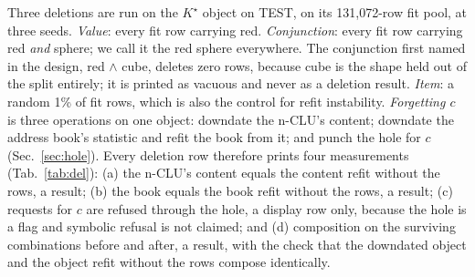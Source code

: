 \documentclass{article} %
\newcommand{\Kstar}{\ensuremath{K^{\star}}}
\begin{document}
Three deletions are run on the $\Kstar$ object on TEST, on its 131,072-row fit pool, at three %
seeds. \emph{Value}: every fit row carrying red. \emph{Conjunction}: every fit row carrying red
\emph{and} sphere; we call it the red sphere everywhere. The conjunction first named in the design,
red $\wedge$ cube, deletes zero rows, because cube is the shape held out of the split entirely; it is
printed as vacuous and never as a deletion result. \emph{Item}: a random 1\% of fit rows, which is
also the control for refit instability. \emph{Forgetting $c$} is three operations on one object:
downdate the n-CLU's content; downdate the address book's statistic and refit the book from it; and punch the
hole for $c$ (Sec.~\ref{sec:hole}). Every deletion row therefore prints four measurements
(Tab.~\ref{tab:del}): (a) the n-CLU's content equals the content refit without the rows, a result; (b) the book
equals the book refit without the rows, a result; (c) requests for $c$ are refused through the hole,
a display row only, because the hole is a flag and symbolic refusal is not claimed; and (d)
composition on the surviving combinations before and after, a result, with the check that the downdated
object and the object refit without the rows compose identically.
\end{document}
